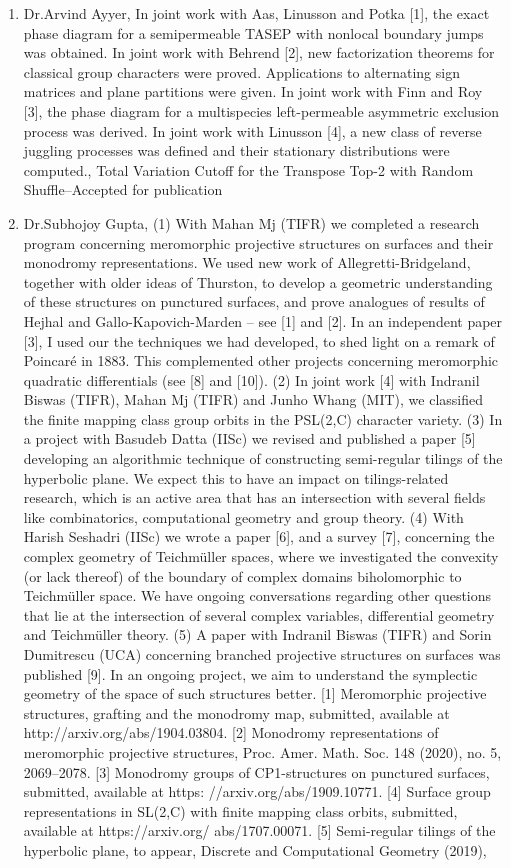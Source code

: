 \begin{enumerate}
\item Dr.Arvind Ayyer, In joint work with Aas, Linusson and Potka [1], the exact phase diagram for a semipermeable TASEP with nonlocal boundary jumps was obtained. In joint work with Behrend [2], new factorization theorems for classical group characters were proved. Applications to alternating sign matrices and plane partitions were given. In joint work with Finn and Roy [3], the phase diagram for a multispecies left-permeable asymmetric exclusion process was derived. In joint work with Linusson [4], a new class of reverse juggling processes was defined and their stationary distributions were computed., Total Variation Cutoff for the Transpose Top-2 with Random Shuffle--Accepted for publication
\item Dr.Subhojoy Gupta, (1) With Mahan Mj (TIFR)  we completed a  research program concerning meromorphic projective structures on surfaces and their monodromy representations. We used new  work of Allegretti-Bridgeland, together with older ideas of Thurston, to develop a geometric understanding of these structures on punctured surfaces, and prove analogues of results of Hejhal and Gallo-Kapovich-Marden -- see [1] and [2]. In an independent paper [3], I used our the techniques we had developed, to shed light on a remark of Poincaré in 1883. This complemented other projects concerning meromorphic quadratic differentials (see [8] and [10]).  (2) In joint work [4] with Indranil Biswas (TIFR), Mahan Mj (TIFR) and Junho Whang (MIT), we classified the finite mapping class group orbits in the PSL(2,C) character variety.  (3) In a project with Basudeb Datta (IISc) we revised and published a paper [5] developing an algorithmic technique of constructing semi-regular tilings of the hyperbolic plane. We expect this to have an impact on tilings-related research, which is an active area that has an intersection with several fields like combinatorics, computational geometry and group theory.   (4)  With Harish Seshadri (IISc) we wrote a paper [6], and a survey [7], concerning the complex geometry of Teichmüller spaces, where we investigated the convexity (or lack thereof) of the boundary of complex domains biholomorphic to Teichmüller space. We have ongoing conversations regarding other questions that lie at the intersection of several complex variables, differential geometry and Teichmüller theory.   (5) A paper with Indranil Biswas (TIFR) and Sorin Dumitrescu (UCA)  concerning branched projective structures on surfaces was published [9]. In an ongoing project, we aim to understand the symplectic geometry of the space of such structures better.  [1] Meromorphic projective structures, grafting and the monodromy map, submitted, available at http://arxiv.org/abs/1904.03804. [2] Monodromy representations of meromorphic projective structures, Proc. Amer. Math. Soc. 148 (2020), no. 5, 2069–2078. [3] Monodromy groups of CP1-structures on punctured surfaces, submitted, available at https: //arxiv.org/abs/1909.10771. [4] Surface group representations in SL(2,C) with finite mapping class orbits, submitted, available at https://arxiv.org/ abs/1707.00071. [5] Semi-regular tilings of the hyperbolic plane, to appear, Discrete and Computational Geometry (2019), 
\end{enumerate}
